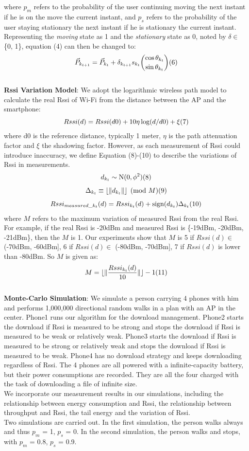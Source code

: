 \documentclass[journal]{IEEEtran}
\begin{document}
where $p_{m}$ refers to the probability of the user continuing moving the next instant if he is on the move the current instant, and 
$p_{s}$ refers to the probability of the user staying stationary the next instant if he is stationary the current instant. 
Representing the \textit{moving} state as 1 and the \textit{stationary} state as 0, noted by $\delta \in$ \{0, 1\}, equation (4) can then be changed to:
\[ \vec{P}_{k_{t+1}} = \vec{P}_{k_{t}} + \delta_{k_{t+1}}s_{k_{t}}{\cos\theta_{k_{t}} \choose \sin\theta_{k_{t}}} \relax(6) \]
\\
\indent
{\bf Rssi Variation Model}:
We adopt the logarithmic wireless path model to calculate the real Rssi of Wi-Fi from the distance between the AP and the smartphone:
$$ Rssi(d) = Rssi(d0) + 10\eta\log(d/d0) + \xi \relax(7)$$
where d0 is the reference distance, typically 1 meter, $\eta$ is the path attenuation factor and $\xi$ the shadowing factor.
However, as each measurement of Rssi could introduce inaccuracy, we define Equation (8)-(10) to describe the variations of Rssi in measurements.
$$ d_{k_{t}} \sim \textrm{N}(0, \phi^2) \relax(8) $$
$$ \Delta_{k_{t}} \equiv \lfloor\|d_{k_{t}}\|\rfloor \pmod{M}  \relax(9) $$
$$ Rssi_{measured\_k_{t}}(d) = Rssi_{k_{t}}(d) + \textrm{sign}(d_{k_{t}})\Delta_{k_{t}} \relax(10)$$
where $M$ refers to the maximum variation of measured Rssi from the real Rssi. 
For example, if the real Rssi is -20dBm and measured Rssi is \{-19dBm, -20dBm, -21dBm\}, 
then the $M$ is 1. 
Our experiments show that $M$ is 
5 if $Rssi(d)\in$ (-70dBm, -60dBm], 
6 if $Rssi(d)\in$ (-80dBm, -70dBm], 
7 if $Rssi(d)$ is lower than -80dBm.
So $M$ is given as:
$$M=\lfloor\|\frac{Rssi_{k_{t}}(d)}{10}\|\rfloor-1 \relax(11)$$
\\
\indent
{\bf Monte-Carlo Simulation}: We simulate a person carrying 4 phones with him and performs 1,000,000 directional random walks in a plan with an AP in the center. 
Phone1 runs our algorithm for the download management.  
Phone2 starts the download if Rssi is measured to be strong and stops the download if Rssi is measured to be weak or relatively weak. 
Phone3 starts the download if Rssi is measured to be strong or relatively weak and stops the download if Rssi is measured to be weak.
Phone4 has no download strategy and keeps downloading regardless of Rssi. 
The 4 phones are all powered with 
a infinite-capacity battery, but their power consumptions are recorded. They are all the four charged with the task of downloading a file of infinite size. 
\\
\indent
We incorporate our measurement results in our simulations, including the relationship between energy consumption and Rssi, the relationship between
throughput and Rssi, the tail energy and the variation of Rssi.
\\
\indent
Two simulations are carried out. In the first simulation, 
the person walks always and thus $p_{m}$ = 1, $p_{s}$ = 0. 
In the second simulation, the person walks and stops, with $p_{m}$ = 0.8, $p_{s}$ = 0.9. 
\end{document}
